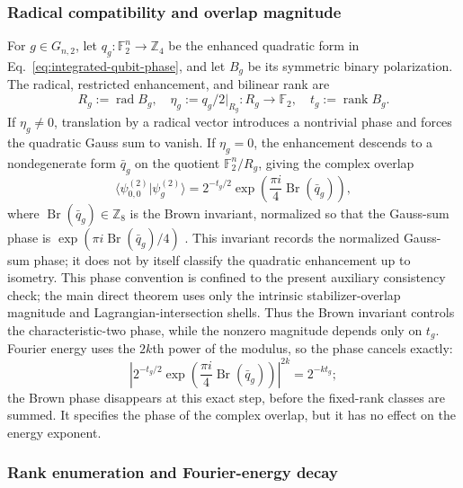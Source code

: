 \documentclass[11pt]{article}
\newcommand{\F}{\mathbb F}
\newcommand{\rank}{\operatorname{rank}}
\newcommand{\1}{\mathbf 1}
\theoremstyle{plain}
\theoremstyle{definition}
\theoremstyle{remark}
\begin{document}
\subsubsection{Radical compatibility and overlap magnitude}
\label{subsubsec:z4-radical-overlap}
For $g\in G_{n,2}$, let $q_g:\F_2^n\to\mathbb Z_4$ be the enhanced quadratic
form in Eq.~\eqref{eq:integrated-qubit-phase}, and let $B_g$ be its symmetric
binary polarization.  The radical, restricted enhancement, and bilinear rank
are
\begin{equation}
 R_g:=\operatorname{rad}B_g,
 \quad \eta_g:=q_g/2|_{R_g}:R_g\to\F_2,
 \quad t_g:=\rank B_g.
 \label{eq:integrated-qubit-gauss-invariants}
\end{equation}
If $\eta_g\ne0$, translation by a radical vector introduces a nontrivial
phase and forces the quadratic Gauss sum to vanish.  If $\eta_g=0$, the
enhancement descends to a nondegenerate form $\bar q_g$ on the quotient
$\F_2^n/R_g$, giving the complex overlap
\begin{equation}
 \langle\psi_{0,0}^{(2)}|\psi_g^{(2)}\rangle
 =2^{-t_g/2}
 \exp\!\left(\frac{\pi i}{4}\operatorname{Br}(\bar q_g)\right),
 \label{eq:integrated-qubit-overlap-classification}
\end{equation}
where $\operatorname{Br}(\bar q_g)\in\mathbb Z_8$ is the Brown invariant,
normalized so that the Gauss-sum phase is
$\exp(\pi i\operatorname{Br}(\bar q_g)/4)$
\cite{Brown1972Kervaire,Taylor2022GaussSums}.  This invariant records the
normalized Gauss-sum phase; it does not by itself classify the quadratic
enhancement up to isometry.  This phase convention is confined to the present auxiliary consistency check; the main direct theorem uses only the intrinsic stabilizer-overlap magnitude and Lagrangian-intersection shells.
Thus the Brown invariant controls the characteristic-two phase, while the
nonzero magnitude depends only on $t_g$.  Fourier energy uses the $2k$th power
of the modulus, so the phase cancels exactly:
\begin{equation}
 \left|2^{-t_g/2}
 \exp\!\left(\frac{\pi i}{4}\operatorname{Br}(\bar q_g)\right)\right|^{2k}
 =2^{-kt_g};
 \label{eq:integrated-qubit-Brown-phase-cancels}
\end{equation}
the Brown phase disappears at this exact step, before the fixed-rank classes are
summed.  It specifies the phase of the complex overlap, but it has no effect on
the energy exponent.

\subsubsection{Rank enumeration and Fourier-energy decay}
\label{subsubsec:z4-rank-energy-decay}
\end{document}
